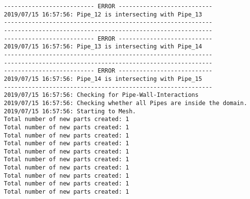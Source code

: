 \documentclass{article}
\begin{document}
{\begin{verbatim}
-------------------------- ERROR ---------------------------
2019/07/15 16:57:56: Pipe_12 is intersecting with Pipe_13
------------------------------------------------------------
------------------------------------------------------------
-------------------------- ERROR ---------------------------
2019/07/15 16:57:56: Pipe_13 is intersecting with Pipe_14
------------------------------------------------------------
------------------------------------------------------------
-------------------------- ERROR ---------------------------
2019/07/15 16:57:56: Pipe_14 is intersecting with Pipe_15
------------------------------------------------------------
2019/07/15 16:57:56: Checking for Pipe-Wall-Interactions
2019/07/15 16:57:56: Checking whether all Pipes are inside the domain.
2019/07/15 16:57:56: Starting to Mesh.
Total number of new parts created: 1
Total number of new parts created: 1
Total number of new parts created: 1
Total number of new parts created: 1
Total number of new parts created: 1
Total number of new parts created: 1
Total number of new parts created: 1
Total number of new parts created: 1
Total number of new parts created: 1
Total number of new parts created: 1
\end{verbatim}
}
\clearpage
\end{document}
